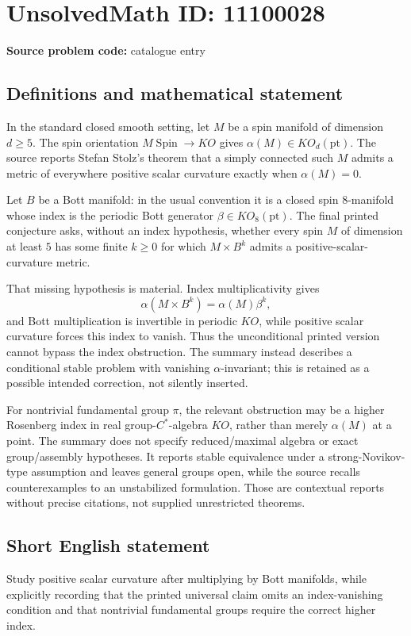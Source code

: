 \documentclass[11pt]{article}
\begin{document}
\section*{UnsolvedMath ID: 11100028}
\textbf{Source problem code:} catalogue entry
\subsection{Definitions and mathematical statement}
In the standard closed smooth setting, let \(M\) be a spin manifold of dimension \(d\geq5\). The spin orientation \(M\operatorname{Spin}\to KO\) gives \(\alpha(M)\in KO_d(\mathrm{pt})\). The source reports Stefan Stolz's theorem that a simply connected such \(M\) admits a metric of everywhere positive scalar curvature exactly when \(\alpha(M)=0\).

Let \(B\) be a Bott manifold: in the usual convention it is a closed spin \(8\)-manifold whose index is the periodic Bott generator \(\beta\in KO_8(\mathrm{pt})\). The final printed conjecture asks, without an index hypothesis, whether every spin \(M\) of dimension at least \(5\) has some finite \(k\geq0\) for which \(M\times B^k\) admits a positive-scalar-curvature metric.

That missing hypothesis is material. Index multiplicativity gives
\[
 \alpha(M\times B^k)=\alpha(M)\beta^k,
\]
and Bott multiplication is invertible in periodic \(KO\), while positive scalar curvature forces this index to vanish. Thus the unconditional printed version cannot bypass the index obstruction. The summary instead describes a conditional stable problem with vanishing \(\alpha\)-invariant; this is retained as a possible intended correction, not silently inserted.

For nontrivial fundamental group \(\pi\), the relevant obstruction may be a higher Rosenberg index in real group-\(C^*\)-algebra \(KO\), rather than merely \(\alpha(M)\) at a point. The summary does not specify reduced/maximal algebra or exact group/assembly hypotheses. It reports stable equivalence under a strong-Novikov-type assumption and leaves general groups open, while the source recalls counterexamples to an unstabilized formulation. Those are contextual reports without precise citations, not supplied unrestricted theorems.
\subsection{Short English statement}
Study positive scalar curvature after multiplying by Bott manifolds, while explicitly recording that the printed universal claim omits an index-vanishing condition and that nontrivial fundamental groups require the correct higher index.
\end{document}
